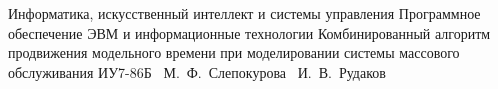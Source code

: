 \documentclass{bmstu}
\begin{document}
\def\labelitemi{--}

\makeresearchtitle
    {Информатика, искусственный интеллект и системы управления} %
    {Программное обеспечение ЭВМ и информационные технологии} %
    {Комбинированный алгоритм продвижения модельного времени при моделировании системы массового обслуживания} %
    {ИУ7-86Б} %
    {~М.~Ф.~Слепокурова} %
    {~И.~В.~Рудаков} %
    {}
    {}



\maketableofcontents








\makebibliography


\end{document}
